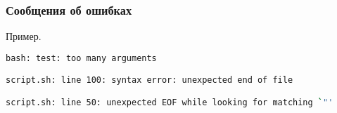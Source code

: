 \begin{frame}[fragile]
	\frametitle{Сообщения об ошибках}

	\begin{block}{Пример.}
		\begin{lstlisting}[language=sh]
bash: test: too many arguments

script.sh: line 100: syntax error: unexpected end of file

script.sh: line 50: unexpected EOF while looking for matching `"' 


		\end{lstlisting}
	\end{block}

\end{frame}

